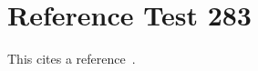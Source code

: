 \documentclass{article}
\begin{document}
\section{Reference Test 283}
This cites a reference~\cite{test283}.

\end{document}
